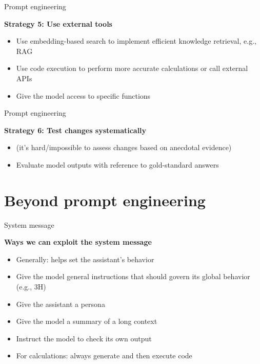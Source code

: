 \documentclass[11pt,compress,t,notes=noshow, xcolor=table]{beamer}
\begin{document}
\begin{vbframe}{Prompt engineering}

\vfill

\textbf{Strategy 5: Use external tools}


\begin{itemize}


\item     Use embedding-based search to implement efficient
    knowledge retrieval, e.g., RAG
\item         Use code execution to perform more accurate
    calculations or call external APIs
\item         Give the model access to specific functions

\end{itemize}

\vfill

\end{vbframe}
\begin{vbframe}{Prompt engineering}

\vfill

\textbf{Strategy 6: Test changes systematically}


\begin{itemize}
\item (it's hard/impossible to assess changes based on
anecdotal evidence)
\item     Evaluate model outputs with reference to gold-standard answers

\end{itemize}

\vfill

\end{vbframe}





\section{Beyond prompt engineering}




\begin{vbframe}{System message}

\vfill

\textbf{Ways we can exploit the system message}

	\begin{itemize}
		\item Generally: helps set the assistant's
		behavior
		\item Give the model general instructions
		that should govern its global behavior
		(e.g., 3H)
                		\item Give the assistant a persona
                \item Give the model a summary of a long context
                \item Instruct the model to check its own output
\item For calculations: always generate and then execute code
	\end{itemize}

\vfill

\end{vbframe}
\end{document}
